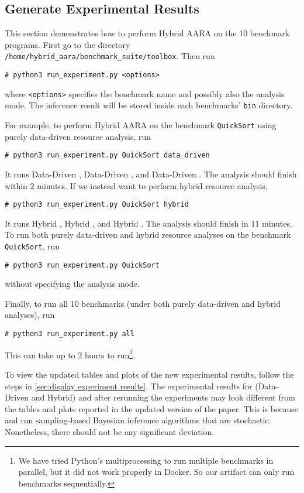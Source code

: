 \subsection{Generate Experimental Results}
\label{sec:generate experiment results}

This section demonstrates how to perform Hybrid AARA on the 10 benchmark
programs.
%
First go to the directory \texttt{/home/hybrid\_aara/benchmark\_suite/toolbox}.
%
Then run
\begin{verbatim}
# python3 run_experiment.py <options>
\end{verbatim}
where \texttt{<options>} specifies the benchmark name and possibly also the
analysis mode.
%
The inference result will be stored inside each benchmarks' \texttt{bin}
directory.

For example, to perform Hybrid AARA on the benchmark \texttt{QuickSort} using
purely data-driven resource analysis, run
\begin{verbatim}
# python3 run_experiment.py QuickSort data_driven
\end{verbatim}
%
It runs Data-Driven \Opt{}, Data-Driven \BayesWC{}, and Data-Driven \BayesPC{}.
%
The analysis should finish within 2 minutes.
%
If we instead want to perform hybrid resource analysis,
\begin{verbatim}
# python3 run_experiment.py QuickSort hybrid
\end{verbatim}
%
It runs Hybrid \Opt{}, Hybrid \BayesWC{}, and Hybrid \BayesPC{}.
%
The analysis should finish in 11 minutes.
%
To run both purely data-driven and hybrid resource analyses on the benchmark
\texttt{QuickSort}, run
\begin{verbatim}
# python3 run_experiment.py QuickSort
\end{verbatim}
without specifying the analysis mode.

Finally, to run all 10 benchmarks (under both purely data-driven and hybrid
analyses), run
\begin{verbatim}
# python3 run_experiment.py all
\end{verbatim}
This can take up to 2 hours to run\footnote{We have tried Python's
multiprocessing to run multiple benchmarks in parallel, but it did not work
properly in Docker. So our artifact can only run benchmarks sequentially.}.

To view the updated tables and plots of the new experimental results, follow the
steps in \cref{sec:display experiment results}.
%
The experimental results for (Data-Driven and Hybrid) \BayesWC{} and \BayesPC{}
after rerunning the experiments may look different from the tables and plots
reported in the updated version of the paper.
%
This is because \BayesWC{} and \BayesPC{} run sampling-based Bayesian inference
algorithms that are stochastic.
%
Nonetheless, there should not be any significant deviation.

